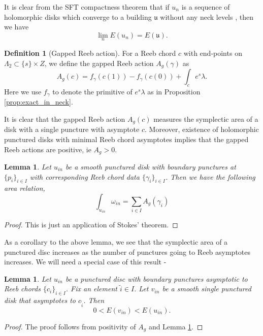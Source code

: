 \documentclass[11pt, oneside,dvipsnames]{amsart}
\newcommand{\wt}{\widetilde}
\newcommand{\<}{\langle}
\renewcommand{\>}{\rangle}
\newcommand{\inn}{{in}}
\newtheorem{lemma}[Theorem]{Lemma}
\theoremstyle{definition}
\theoremstyle{definition}
\newtheorem{defn}[Theorem]{Definition}
\numberwithin{equation}{subsection}
\begin{document}
It is clear from the SFT compactness theorem that if $u_n$ is a sequence of holomorphic disks which converge to a building $\mathfrak{u}$ without any neck levels , then we have $$\lim_n E(u_n) = E(\mathfrak{u}).$$ 
\noindent

\begin{defn}[Gapped Reeb action]
    For a Reeb chord $c$ with end-points on $\Lambda_2 \subset \{s\} \times Z$, we define the gapped Reeb action $A_g(\gamma)$ as $$A_g(c) = f_\gamma(c(1)) - f_\gamma(c(0))+ \int_c e^s\lambda. $$ Here we use $f_\gamma$ to denote the primitive of $e^s\lambda$ as in Proposition \ref{prop:exact_in_neck}.
\end{defn}


\noindent  It is clear that the gapped Reeb action $A_g(c)$ measures the symplectic area of a disk with a single puncture with asymptote $c$. Moreover, existence of holomorphic punctured disks with minimal Reeb chord asymptotes implies that the gapped Reeb actions are positive, ie $A_g > 0.$

\begin{lemma}\label{lemm:area_comp_inside}
    Let $u_\inn$ be a smooth punctured disk with boundary punctures at $\{p_i \}_{i\in I}$ with corresponding Reeb chord data $\{ \gamma_i\}_{i\in I}$. Then we have the following area relation,
    \begin{equation}
        \int_{u_{in}}\omega_\inn  = \sum_{i\in I}A_g(\gamma_i)
    \end{equation}
\end{lemma}

\begin{proof}
    This is just an application of Stokes' theorem.
\end{proof}

\noindent As a corollary to the above lemma, we see that the symplectic area of a punctured disc increases as the number of  punctures going to Reeb asymptotes increases. We will need a special case of this result - 

\begin{lemma}\label{lemm:single_area_small}
Let $u_\inn$ be a punctured disc with boundary punctures asymptotic to Reeb chords $\{c_i\}_{i\in I}$. Fix an element $\wt i \in I$. Let $v_\inn$ be a \textit{smooth}  single punctured disk that asymptotes to $c_{\wt i}$. Then $$0<E(v_\inn) < E(u_\inn).$$

\end{lemma}
\begin{proof}
    The proof follows from positivity of $A_g$ and Lemma \ref{lemm:area_comp_inside}.
\end{proof}
\end{document}
